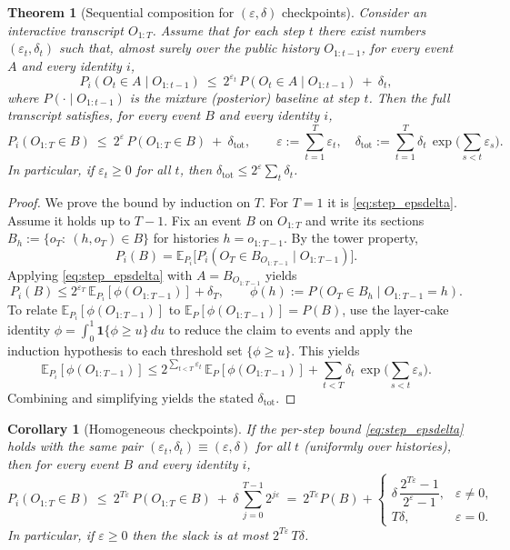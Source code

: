 \documentclass[11pt]{article}
\newcommand{\EE}{\mathbb{E}}
\newcommand{\one}{\mathbf{1}}
\newtheorem{theorem}{Theorem}
\newtheorem{corollary}{Corollary}
\theoremstyle{definition}
\theoremstyle{remark}
\begin{document}
\begin{theorem}[Sequential composition for $(\varepsilon,\delta)$ checkpoints]\label{thm:epsdelta_comp}
Consider an interactive transcript $O_{1:T}$.
Assume that for each step $t$ there exist numbers $(\varepsilon_t,\delta_t)$ such that, almost surely over the public history $O_{1:t-1}$,
for every event $A$ and every identity $i$,
\begin{equation}\label{eq:step_epsdelta}
P_i(O_t\in A\mid O_{1:t-1})\ \le\ 2^{\varepsilon_t}\,P(O_t\in A\mid O_{1:t-1})\ +\ \delta_t,
\end{equation}
where $P(\cdot\mid O_{1:t-1})$ is the mixture (posterior) baseline at step $t$.
Then the full transcript satisfies, for every event $B$ and every identity $i$,
\[
P_i(O_{1:T}\in B)\ \le\ 2^{\varepsilon}\,P(O_{1:T}\in B)\ +\ \delta_{\mathrm{tot}},
\qquad \varepsilon:=\sum_{t=1}^T \varepsilon_t,\quad
\delta_{\mathrm{tot}}:=\sum_{t=1}^T \delta_t\,\exp\Big(\sum_{s<t}\varepsilon_s\Big).
\]
In particular, if $\varepsilon_t\ge 0$ for all $t$, then $\delta_{\mathrm{tot}}\le 2^{\varepsilon}\sum_t\delta_t$.
\end{theorem}

\begin{proof}
We prove the bound by induction on $T$.
For $T=1$ it is \eqref{eq:step_epsdelta}.
Assume it holds up to $T-1$.
Fix an event $B$ on $O_{1:T}$ and write its sections
$B_h:=\{o_T:\ (h,o_T)\in B\}$ for histories $h=o_{1:T-1}$.
By the tower property,
\[
P_i(B)=\EE_{P_i}\bigl[P_i(O_T\in B_{O_{1:T-1}}\mid O_{1:T-1})\bigr].
\]
Applying \eqref{eq:step_epsdelta} with $A=B_{O_{1:T-1}}$ yields
\[
P_i(B)\le 2^{\varepsilon_T}\,\EE_{P_i}[\phi(O_{1:T-1})]+\delta_T,
\qquad \phi(h):=P(O_T\in B_h\mid O_{1:T-1}=h).
\]
To relate $\EE_{P_i}[\phi(O_{1:T-1})]$ to $\EE_P[\phi(O_{1:T-1})]=P(B)$, use the layer-cake identity
$\phi=\int_0^1 \one\{\phi\ge u\}\,du$ to reduce the claim to events and apply the induction hypothesis to each threshold set $\{\phi\ge u\}$.
This yields
\[
\EE_{P_i}[\phi(O_{1:T-1})]\le 2^{\sum_{t<T}\varepsilon_t}\,\EE_P[\phi(O_{1:T-1})]+\sum_{t<T}\delta_t\,\exp\Big(\sum_{s<t}\varepsilon_s\Big).
\]
Combining and simplifying yields the stated $\delta_{\mathrm{tot}}$.
\end{proof}

\begin{corollary}[Homogeneous checkpoints]\label{cor:homog_checkpoints}
If the per-step bound \eqref{eq:step_epsdelta} holds with the same pair $(\varepsilon_t,\delta_t)\equiv(\varepsilon,\delta)$ for all $t$ (uniformly over histories), then for every event $B$ and every identity $i$,
\[
P_i(O_{1:T}\in B)\ \le\ 2^{T\varepsilon}\,P(O_{1:T}\in B)\ +\ \delta\,\sum_{j=0}^{T-1} 2^{j\varepsilon}
\ =\ 2^{T\varepsilon}P(B)+\begin{cases}
\delta\,\dfrac{2^{T\varepsilon}-1}{2^{\varepsilon}-1}, & \varepsilon\neq 0,\\
T\delta, & \varepsilon=0.
\end{cases}
\]
In particular, if $\varepsilon\ge 0$ then the slack is at most $2^{T\varepsilon}\,T\delta$.
\end{corollary}
\end{document}
